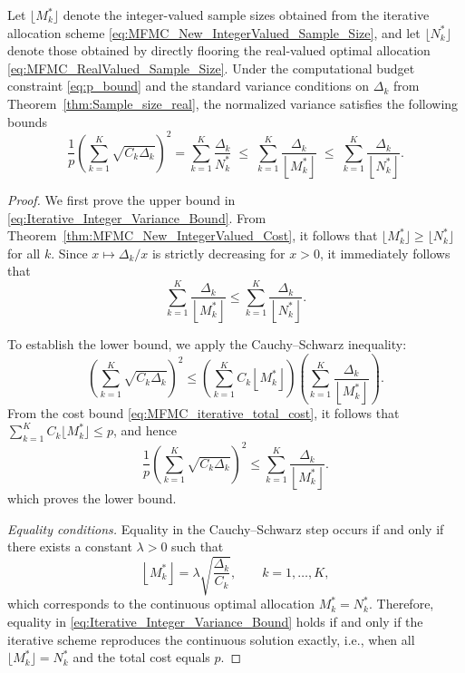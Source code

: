 %
\begin{theorem}
\label{thm:MFMC_New_IntegerValued_Variance}
Let $\lfloor M_k^* \rfloor$ denote the integer-valued sample sizes obtained from the iterative allocation scheme \eqref{eq:MFMC_New_IntegerValued_Sample_Size}, and let $\lfloor N_k^* \rfloor$ denote those obtained by directly flooring the real-valued optimal allocation \eqref{eq:MFMC_RealValued_Sample_Size}. Under the computational budget constraint \eqref{eq:p_bound} and the standard variance conditions on $\Delta_k$ from Theorem~\ref{thm:Sample_size_real}, the normalized variance satisfies the following bounds
%
\begin{equation}\label{eq:Iterative_Integer_Variance_Bound}
\frac{1}{p}\left(\sum_{k=1}^K \sqrt{C_k \Delta_k}\right)^2
= \sum_{k=1}^K \frac{\Delta_k}{N_k^*}
\;\le\;
\sum_{k=1}^K \frac{\Delta_k}{\left\lfloor M_k^* \right\rfloor}
\;\le\;
\sum_{k=1}^K \frac{\Delta_k}{\left\lfloor N_k^* \right\rfloor}.
\end{equation}
%
\end{theorem}
%




\begin{proof}
We first prove the upper bound in \eqref{eq:Iterative_Integer_Variance_Bound}.  
From Theorem~\ref{thm:MFMC_New_IntegerValued_Cost}, it follows that $\lfloor M_k^* \rfloor \ge \lfloor N_k^* \rfloor$ for all $k$.  
Since $x \mapsto \Delta_k/x$ is strictly decreasing for $x > 0$, it immediately follows that
\[
\sum_{k=1}^K \frac{\Delta_k}{\left\lfloor M_k^* \right\rfloor} 
\le \sum_{k=1}^K \frac{\Delta_k}{\left\lfloor N_k^* \right\rfloor}.
\]

\medskip
\noindent
To establish the lower bound, we apply the Cauchy--Schwarz inequality:
%
\[
\left(\sum_{k=1}^K \sqrt{C_k \Delta_k}\right)^2
\le
\left(\sum_{k=1}^K C_k \left\lfloor M_k^* \right\rfloor\right)
\left(\sum_{k=1}^K \frac{\Delta_k}{\left\lfloor M_k^* \right\rfloor}\right).
\]
%
From the cost bound \eqref{eq:MFMC_iterative_total_cost}, it follows that 
$\sum_{k=1}^K C_k \lfloor M_k^* \rfloor \le p$, and hence
%
\[
\frac{1}{p}\left(\sum_{k=1}^K \sqrt{C_k \Delta_k}\right)^2
\le
\sum_{k=1}^K \frac{\Delta_k}{\left\lfloor M_k^* \right\rfloor}.
\]
%
which proves the lower bound.

\medskip
\noindent
\textit{Equality conditions.} 
Equality in the Cauchy--Schwarz step occurs if and only if there exists a constant $\lambda>0$ such that
\[
\left\lfloor M_k^* \right\rfloor = \lambda \sqrt{\frac{\Delta_k}{C_k}}, \qquad k=1,\ldots,K,
\]
which corresponds to the continuous optimal allocation $M_k^* = N_k^*$. Therefore, equality in \eqref{eq:Iterative_Integer_Variance_Bound} holds if and only if the iterative scheme reproduces the continuous solution exactly, i.e., when all $\lfloor M_k^* \rfloor = N_k^*$ and the total cost equals $p$.
\end{proof}



